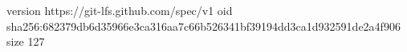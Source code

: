 version https://git-lfs.github.com/spec/v1
oid sha256:682379db6d35966e3ca316aa7c66b526341bf39194dd3ca1d932591de2a4f906
size 127
